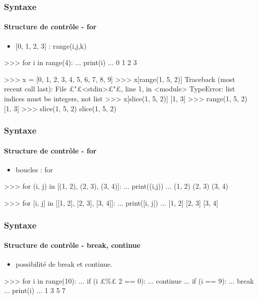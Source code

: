 \begin{frame}[fragile]
\frametitle{Syntaxe}
\framesubtitle{Structure de contrôle - for}
\begin{itemize}
\item {[0, 1, 2, 3]} : range(i,j,k) 
\end{itemize}
\begin{pythonConsole}
>>> for i in range(4): 
...     print(i)
... 
0
1
2
3
\end{pythonConsole}
\begin{pythonConsole}
>>> x = [0, 1, 2, 3, 4, 5, 6, 7, 8, 9]
>>> x[range(1, 5, 2)]
Traceback (most recent call last):
  File £"£<stdin>£"£, line 1, in <module>
TypeError: list indices must be integers, not list
>>> x[slice(1, 5, 2)]
[1, 3]
>>> range(1, 5, 2)
[1, 3]
>>> slice(1, 5, 2)
slice(1, 5, 2)
\end{pythonConsole}
\end{frame}
\begin{frame}[fragile]
\frametitle{Syntaxe}
\framesubtitle{Structure de contrôle - for}
\begin{itemize}
\item boucles : for 
\end{itemize}
\begin{pythonConsole}
>>> for (i, j) in [(1, 2), (2, 3), (3, 4)]: 
...   print((i,j))
... 
(1, 2)
(2, 3)
(3, 4)
\end{pythonConsole}
\begin{pythonConsole}
>>> for [i, j] in [[1, 2], [2, 3], [3, 4]]: 
...   print([i, j])
... 
[1, 2]
[2, 3]
[3, 4]
\end{pythonConsole}
\end{frame}
\begin{frame}[fragile]
\frametitle{Syntaxe}
\framesubtitle{Structure de contrôle - break, continue}
\begin{itemize}
\item possibilité de break et continue. 
\end{itemize}
\begin{pythonConsole}
>>> for i in range(10):
...   if (i £\%£ 2 == 0): 
...     continue
...   if (i == 9): 
...     break
...   print(i)
...
1
3
5
7
\end{pythonConsole}
\end{frame}
